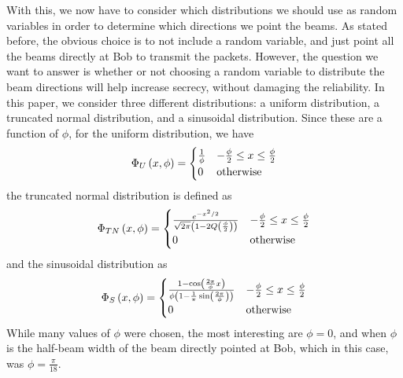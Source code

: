 \documentclass[letterpaper, 10 pt, conference]{ieeetran}  %
\theoremstyle{definition}
\theoremstyle{theorem}
\begin{document}
With this, we now have to consider which distributions we should use as random variables in order to determine which directions we point the beams.  
As stated before, the obvious choice is to not include a random variable, and just point all the beams directly at Bob to transmit the packets.  
However, the question we want to answer is whether or not choosing a random variable to distribute the beam directions will help increase secrecy, without damaging the reliability.  
In this paper, we consider three different distributions: a uniform distribution, a truncated normal distribution, and a sinusoidal distribution.  
Since these are a function of $\phi$, for the uniform distribution, we have
\begin{equation}
\Phi_U\left(x,\phi\right) = \begin{cases} \frac{1}{\phi} & -\frac{\phi}{2} \leq x \leq \frac{\phi}{2} \\ 0 & \textnormal{otherwise} \end{cases}
\end{equation}
the truncated normal distribution is defined as
\begin{equation}
\Phi_{TN}\left(x,\phi\right) = \begin{cases} \frac{e^{-x^{2}/2}}{\sqrt{2\pi}\left(1 - 2Q\left(\frac{\phi}{2}\right)\right)} & -\frac{\phi}{2} \leq x \leq \frac{\phi}{2} \\ 0 & \textnormal{otherwise} \end{cases}
\end{equation}
and the sinusoidal distribution as
\begin{equation}
\Phi_{S}\left(x,\phi\right) = \begin{cases} \frac{1-\cos\left(\frac{2\pi}{\phi}x\right)}{\phi\left(1-\frac{1}{\pi}\sin\left(\frac{2\pi}{\phi}\right)\right)} & -\frac{\phi}{2} \leq x \leq \frac{\phi}{2} \\ 0 & \textnormal{otherwise} \end{cases}
\end{equation}
While many values of $\phi$ were chosen, the most interesting are $\phi = 0$, and when $\phi$ is the half-beam width of the beam directly pointed at Bob, which in this case, was $\phi = \frac{\pi}{18}$.
\end{document}

